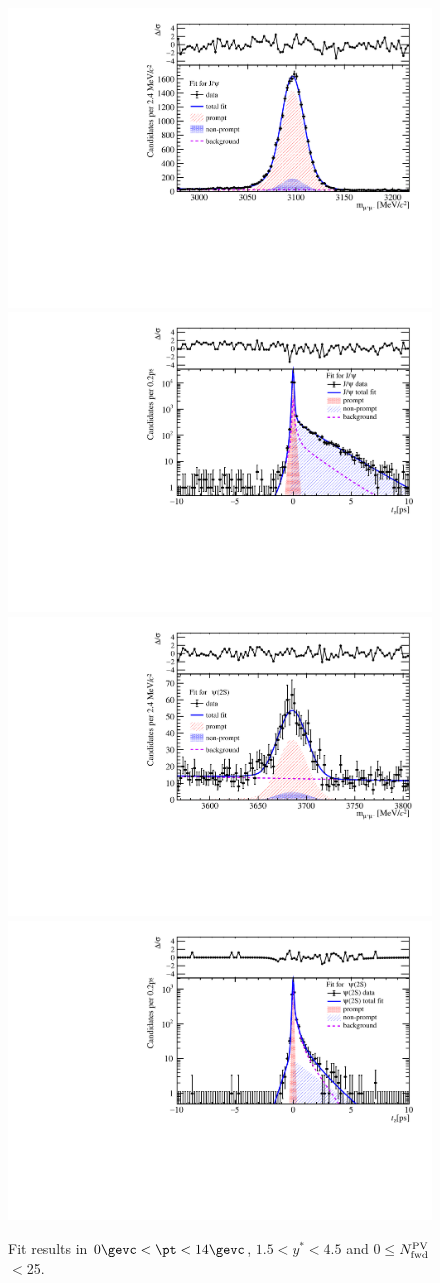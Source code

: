 \begin{figure}[H]
\begin{center}
\includegraphics[width=0.45\linewidth]{pdf/pPb/FWorkdir/TwoDimFit/ProjMass/Jpsi_n1y1pt1.pdf}
\includegraphics[width=0.45\linewidth]{pdf/pPb/FWorkdir/TwoDimFit/ProjTz/Jpsi_n1y1pt1.pdf}
\vspace*{-0.5cm}
\includegraphics[width=0.45\linewidth]{pdf/pPb/FWorkdir/TwoDimFit/ProjMass/Psi2S_n1y1pt1.pdf}
\includegraphics[width=0.45\linewidth]{pdf/pPb/FWorkdir/TwoDimFit/ProjTz/Psi2S_n1y1pt1.pdf}
\vspace*{-0.5cm}
\end{center}
\caption{Fit results in $0\gevc<\pt<14\gevc$, $1.5<y^*<4.5$ and 0$\leq$$N_{\rm fwd}^{\rm PV}$$<$25.}
\end{figure}
